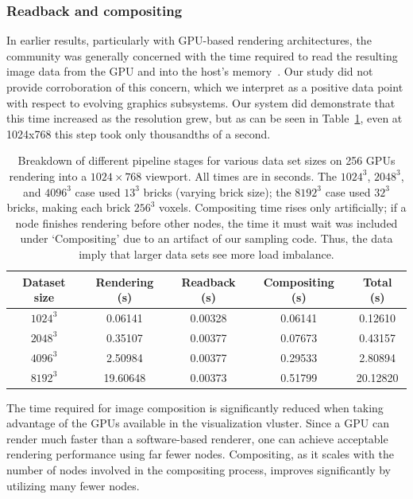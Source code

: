 \subsubsection{Readback and compositing}

In earlier results, particularly with GPU-based rendering
architectures, the community was generally concerned with the time
required to read the resulting image data from the GPU and into the
host's
memory~\cite{Marchesin:2008:MultiGPU}.  Our study did not provide
corroboration of this concern, which we interpret as a positive data
point with respect to evolving graphics subsystems.  Our system did
demonstrate that this time increased as the resolution grew, but as can
be seen
in Table~\ref{tbl:breakdown}, even at 1024x768 this step took only
thousandths of a second.

\begin{table}
	\begin{tabular}{|c|ccc|c|}\hline
	\textbf{Dataset size} & \textbf{Rendering (s)} & \textbf{Readback (s)} &
		\textbf{Compositing (s)} & \textbf{Total (s)}\\\hline
	$1024^3$ &  0.06141 & 0.00328 & 0.06141 &  0.12610 \\
	$2048^3$ &  0.35107 & 0.00377 & 0.07673 &  0.43157 \\
	$4096^3$ &  2.50984 & 0.00377 & 0.29533 &  2.80894 \\
	$8192^3$ & 19.60648 & 0.00373 & 0.51799 & 20.12820 \\\hline
	\end{tabular}

  \caption{Breakdown of different pipeline stages for various data set
  sizes on 256 GPUs rendering into a $1024 \times 768$ viewport.  All
  times are in seconds.  The $1024^3$, $2048^3$, and $4096^3$ case used
  $13^3$ bricks (varying brick size); the $8192^3$ case used $32^3$
  bricks, making each brick $256^3$ voxels.  Compositing time rises
  only artificially; if a node finishes rendering before other nodes,
  the time it must wait was included under `Compositing' due to an
  artifact of our sampling code.  Thus, the data imply that larger data
  sets see more load imbalance.}

	\label{tbl:breakdown}
\end{table}

The time required for image composition is significantly reduced when
taking advantage of the GPUs available in the visualization vluster.
Since a GPU can render much faster than a software-based renderer, one
can achieve acceptable rendering performance using far fewer nodes.
Compositing, as it scales with the number of nodes involved in the
compositing process, improves significantly by utilizing many fewer
nodes.

